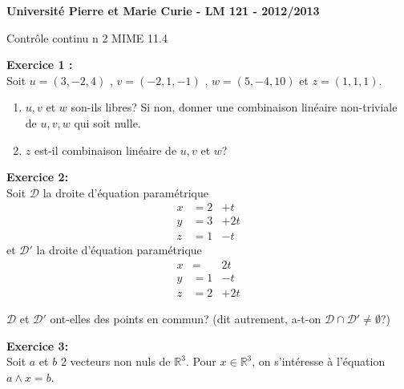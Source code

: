 \documentclass{article}
\newcommand{\R}{\mathbb{R}}
\begin{document}
\large
\noindent 
\textbf{Université Pierre et Marie Curie - LM 121 - 2012/2013}\\
\begin{center}
\Large 
 Contrôle continu n 2 MIME 11.4
\end{center}




\medskip
\noindent
\textbf{Exercice 1 :}\\
Soit $u=(3,-2,4)$ , $v=(-2,1,-1)$ , $w=(5,-4,10)$ et $z=(1,1,1)$. 
\begin{enumerate}
\item$u,v$ et $w$ son-ils libres? Si non, donner une combinaison linéaire non-triviale de 
$u,v,w$ qui soit nulle. 
\item $z$ est-il  combinaison linéaire de $u,v$ et $w$?
\end{enumerate}


\medskip
\noindent
\textbf{Exercice 2:}\\

Soit $\mathcal{D}$ la droite d'équation paramétrique
\[\begin{array}{ccc}
 x&=2&+t \\
y & =3&+2t \\
z & =1&-t 
\end{array} \]
et $\mathcal{D'}$ la droite d'équation paramétrique
\[ \begin{array}{ccc}
 x &=&2t \\
y & =1&-t \\
z & = 2&+2t
\end{array}\]

$\mathcal{D}$ et $\mathcal{D'}$ ont-elles des points en commun? (dit autrement, a-t-on $\mathcal{D} \cap \mathcal{D'} \ne \emptyset$?)



\medskip
\noindent
\textbf{Exercice 3:}\\

Soit $a$ et $b$ 2 vecteurs non nuls de $\mathbb{R}^3$. Pour $x\in \R^3$, on s'intéresse à l'équation $a \wedge x = b$.
\end{document}
